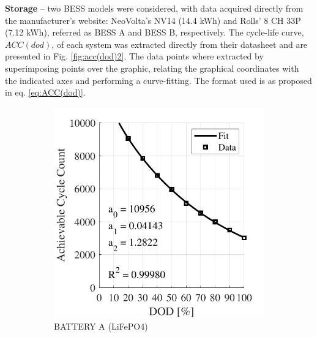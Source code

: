 \documentclass{ieeeaccess}
\begin{document}
	\textbf{Storage} -- two \ac{BESS} models were considered, with data acquired directly from the manufacturer's website: NeoVolta's NV14 (14.4 kWh) and Rolls' 8 CH 33P (7.12 kWh), referred as \ac{BESS} A and \ac{BESS} B, respectively. The cycle-life curve, $ACC(dod)$, of each system was extracted directly from their datasheet and are presented in Fig. \ref{fig:acc(dod)2}. The data points where extracted by superimposing points over the graphic, relating the graphical coordinates with the indicated axes and performing a curve-fitting. The format used is as proposed in eq. \ref{eq:ACC(dod)}.
	\begin{figure}[!h]
		\begin{subfigure}{.235\textwidth}
			\centering
			\includegraphics[width=\linewidth]{figures/acc_fitting_NeoVolta_NV24_LiFePO4.pdf}
			\caption{BATTERY A (LiFePO4)}
			\label{fig:accNeovolta2}
		\end{subfigure}
		\begin{subfigure}{.235\textwidth}
			\centering

\end{subfigure}
\end{figure}
\end{document}
